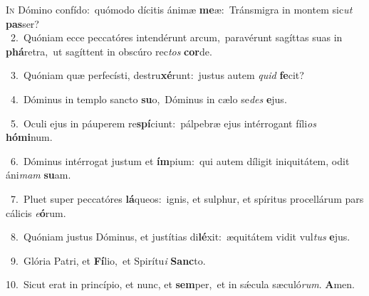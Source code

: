 \lettrine{\initial\textcolor{\initialcolor}{I}}{n} Dómino confído:~\dagger quómodo dícitis ánimæ \textbf{me}\-æ:~\star Tránsmigra in montem sic\textit{ut} \textbf{pas}\-ser?\\
{\numbfont\textcolor{\numbcolor}{~2.}}~Quóniam ecce peccatóres intendérunt arcum,~\dagger paravérunt sagíttas suas in \textbf{phá}\-retra,~\star ut sagíttent in obscúro rec\textit{tos} \textbf{cor}\-de.\par
{\numbfont\textcolor{\numbcolor}{~3.}}~Quóniam quæ perfecísti, destru\-\textbf{xé}\-runt:~\star justus autem \textit{quid} \textbf{fe}\-cit?\par
{\numbfont\textcolor{\numbcolor}{~4.}}~Dóminus in templo sancto \textbf{su}\-o,~\star Dóminus in cælo se\textit{des} \textbf{e}\-jus.\par
{\numbfont\textcolor{\numbcolor}{~5.}}~Oculi ejus in páuperem re\-\textbf{spí}\-ciunt:~\star pálpebræ ejus intérrogant fíli\textit{os} \textbf{hó}\-\textbf{mi}num.\par
{\numbfont\textcolor{\numbcolor}{~6.}}~Dóminus intérrogat justum et \textbf{ím}\-pium:~\star qui autem díligit iniquitátem, odit áni\textit{mam} \textbf{su}\-am.\par
{\numbfont\textcolor{\numbcolor}{~7.}}~Pluet super peccatóres \textbf{lá}\-queos:~\star ignis, et sulphur, et spíritus procellárum pars cálicis \textit{e}\-\textbf{ó}rum.\par
{\numbfont\textcolor{\numbcolor}{~8.}}~Quóniam justus Dóminus, et justítias di\-\textbf{lé}\-xit:~\star æquitátem vidit vul\textit{tus} \textbf{e}\-jus.\par
{\numbfont\textcolor{\numbcolor}{~9.}}~Glória Patri, et \textbf{Fí}\-lio,~\star et Spirítu\textit{i} \textbf{Sanc}\-to.\par
{\numbfont\textcolor{\numbcolor}{10.}}~Sicut erat in princípio, et nunc, et \textbf{sem}\-per,~\star et in sǽcula sæculó\-\textit{rum}\-. \textbf{A}\-men.\par
